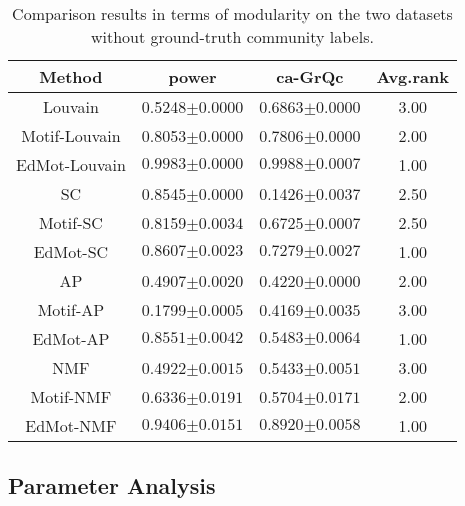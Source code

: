 \documentclass[sigconf]{acmart}
\begin{document}
\begin{table}[!t]
\caption{Comparison results in terms of modularity on the two datasets without ground-truth community labels.}
\label{table:modularity2}
\begin{center}
\vskip -0.1in
\begin{tabular}{@{}c|c|c|c@{}}
  \hline
Method  &power &ca-GrQc&Avg.rank\\
\hline
  Louvain  &0.5248\scriptsize{$\pm0.0000$} & 0.6863\scriptsize{$\pm0.0000$} &3.00\\
  Motif-Louvain &0.8053\scriptsize{$\pm0.0000$} &0.7806\scriptsize{$\pm0.0000$} &2.00\\
  EdMot-Louvain  &$\mathbf{0.9983}$\scriptsize{$\pm0.0000$} & $\mathbf{0.9988}$\scriptsize{$\pm0.0007$} &1.00\\
  \hline
  SC & 0.8545\scriptsize{$\pm0.0000$}& 0.1426\scriptsize{$\pm0.0037$} &2.50\\
  Motif-SC &0.8159\scriptsize{$\pm0.0034$} &0.6725\scriptsize{$\pm0.0007$} &2.50\\
  EdMot-SC & $\mathbf{0.8607}$\scriptsize{$\pm0.0023$} & $\mathbf{0.7279}$\scriptsize{$\pm0.0027$}&1.00 \\
  \hline
  AP  & 0.4907\scriptsize{$\pm0.0020$}  &0.4220\scriptsize{$\pm0.0000$} &2.00\\
  Motif-AP & 0.1799\scriptsize{$\pm0.0005$}     &0.4169\scriptsize{$\pm0.0035$}&3.00\\
  EdMot-AP & $\mathbf{0.8551}$\scriptsize{$\pm0.0042$}    &$\mathbf{0.5483}$\scriptsize{$\pm0.0064$} &1.00\\
  \hline
  NMF  & 0.4922\scriptsize{$\pm0.0015$}    & 0.5433\scriptsize{$\pm0.0051$} &3.00\\
  Motif-NMF & 0.6336\scriptsize{$\pm0.0191$}    &0.5704\scriptsize{$\pm0.0171$} &2.00\\
  EdMot-NMF & $\mathbf{0.9406}$\scriptsize{$\pm0.0151$}    & $\mathbf{0.8920}$\scriptsize{$\pm0.0058$} &1.00\\
  \hline
\end{tabular}
\end{center}
\end{table}














\subsection{Parameter Analysis}
\label{sec:parameter}
\end{document}
